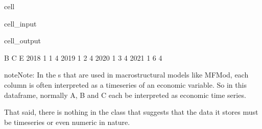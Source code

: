 \documentclass[letterpaper,10pt,english]{jupyterBook}
\begin{document}
\begin{sphinxuseclass}{cell}\begin{sphinxVerbatimInput}

\begin{sphinxuseclass}{cell_input}
\begin{sphinxVerbatim}[commandchars=\\\{\}]
   \PYG{p}{[}\PYG{p}{]}\PYG{p}{[}\PYG{p}{]}\PYG{p}{[}\PYG{p}{]}\PYG{p}{[}\PYG{p}{]}
\end{sphinxVerbatim}

\end{sphinxuseclass}\end{sphinxVerbatimInput}
\begin{sphinxVerbatimOutput}

\begin{sphinxuseclass}{cell_output}
\begin{sphinxVerbatim}[commandchars=\\\{\}]
      B  C  E
2018  1  1  4
2019  1  2  4
2020  1  3  4
2021  1  6  4
\end{sphinxVerbatim}

\end{sphinxuseclass}\end{sphinxVerbatimOutput}

\end{sphinxuseclass}
\begin{sphinxadmonition}{note}{Note:}
\sphinxAtStartPar
In the s that are used in macrostructural models like MFMod, each  column is often interpreted as a time\sphinxhyphen{}series of an economic variable. So in this dataframe,  normally A, B and C each be interpreted as economic time series.

\sphinxAtStartPar
That said, there is nothing in the  class that suggests that the data it stores must be time\sphinxhyphen{}series or even numeric in nature.
\end{sphinxadmonition}
\end{document}
